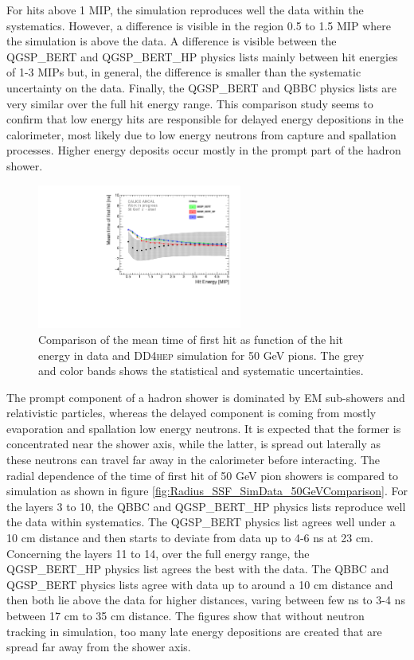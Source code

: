 \documentclass{JINST}
\newcommand\ddhep{\textsc{DD4hep}\xspace}
\begin{document}
For hits above 1 MIP, the simulation reproduces well the data within the systematics. However, a difference is visible in the region 0.5 to 1.5 MIP where the simulation is above the data. A difference is visible between the QGSP\_BERT and QGSP\_BERT\_HP physics lists mainly between hit energies of 1-3 MIPs but, in general, the difference is smaller than the systematic uncertainty on the data. Finally, the QGSP\_BERT and QBBC physics lists are very similar over the full hit energy range. This comparison study seems to confirm that low energy hits are responsible for delayed energy depositions in the calorimeter, most likely due to low energy neutrons from capture and spallation processes. Higher energy deposits occur mostly in the prompt part of the hadron shower.

\begin{figure}[htbp!]
  \centering
  \includegraphics[width=0.6\textwidth]{fig/Time_Energy_50GeV_DD4hep.pdf}
  \caption{Comparison of the mean time of first hit as function of the hit energy in data and \ddhep simulation for 50 GeV pions. The grey and color bands shows the statistical and systematic uncertainties.}
  \label{fig:Energy_SimData_50GeV}
\end{figure}

The prompt component of a hadron shower is dominated by EM sub-showers and relativistic particles, whereas the delayed component is coming from mostly evaporation and spallation low energy neutrons. It is expected that the former is concentrated near the shower axis, while the latter, is spread out laterally as these neutrons can travel far away in the calorimeter before interacting. The radial dependence of the time of first hit of 50 GeV pion showers is compared to simulation as shown in figure \ref{fig:Radius_SSF_SimData_50GeVComparison}. For the layers 3 to 10, the QBBC and QGSP\_BERT\_HP physics lists reproduce well the data within systematics. The QGSP\_BERT physics list agrees well under a 10 cm distance and then starts to deviate from data up to 4-6 ns at 23 cm. Concerning the layers 11 to 14, over the full energy range, the QGSP\_BERT\_HP physics list agrees the best with the data. The QBBC and QGSP\_BERT physics lists agree with data up to around a 10 cm distance and then both lie above the data for higher distances, varing between few ns to 3-4 ns between 17 cm to 35 cm distance. The figures show that without neutron tracking in simulation, too many late energy depositions are created that are spread far away from the shower axis.
\end{document}
